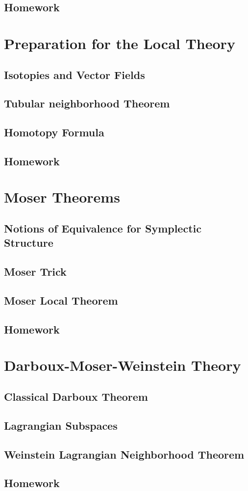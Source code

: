 \documentclass[4paper]{article}
\begin{document}
\subsection{Homework}
\section{Preparation for the Local Theory}
\subsection{Isotopies and Vector Fields}
\subsection{Tubular neighborhood Theorem}
\subsection{Homotopy Formula}
\subsection{Homework}
\section{Moser Theorems}
\subsection{Notions of Equivalence for Symplectic Structure}
\subsection{Moser Trick}
\subsection{Moser Local Theorem}
\subsection{Homework}
\section{Darboux-Moser-Weinstein Theory}
\subsection{Classical Darboux Theorem}
\subsection{Lagrangian Subspaces}
\subsection{Weinstein Lagrangian Neighborhood Theorem}
\subsection{Homework}
\end{document}
